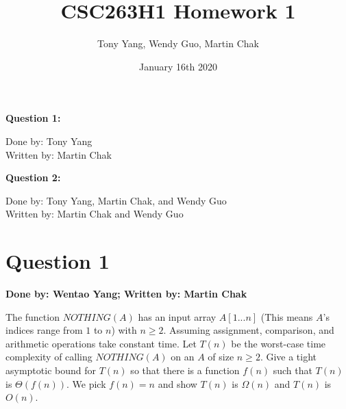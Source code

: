 \documentclass[20pt]{article}
\title{CSC263H1 Homework 1}
\author{Tony Yang, Wendy Guo, Martin Chak}
\date{January 16th 2020}
\begin{document}

\maketitle
\noindent
\textbf{Question 1:}\\
\begin{text}
    Done by: Tony Yang\\
    Written by: Martin Chak\\
\end{text}

\noindent
\textbf{Question 2:}\\
\begin{text}
    Done by: Tony Yang, Martin Chak, and Wendy Guo\\
    Written by: Martin Chak and Wendy Guo\\
\end{text}


\newpage

\section*{Question 1}
\textbf{Done by: Wentao Yang; Written by: Martin Chak}\\
\noindent
\begin{text}
    \indent The function $NOTHING(A)$ has an input array $A [1...n]$ (This means $A$'s indices range from $1$ to $n$) with $n \geq 2$. Assuming assignment, comparison, and arithmetic operations take constant time. Let $T(n)$ be the worst-case time complexity of calling $NOTHING(A)$ on an $A$ of size $n \geq 2$. Give a tight asymptotic bound for $T(n)$ so that there is a function $f(n)$ such that $T(n)$ is $\Theta(f(n))$. We pick $f(n) = n$ and show $T(n)$ is $\Omega(n)$ and $T(n)$ is $O(n)$.\\
\end{text}
\end{document}
